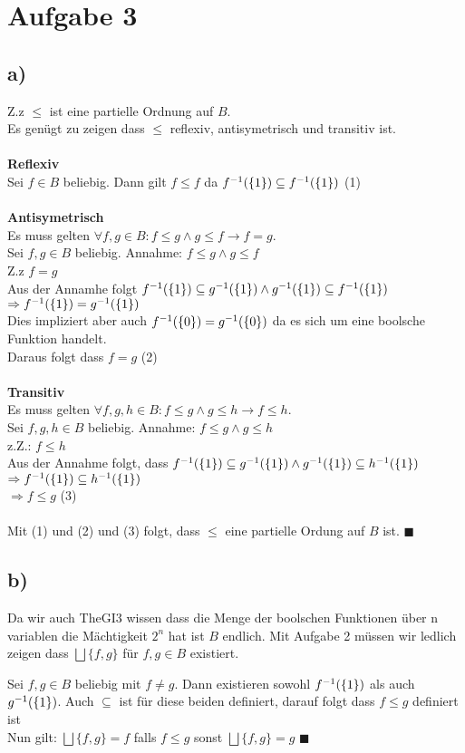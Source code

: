 \section*{Aufgabe 3}
\subsection*{a)}

Z.z $\leq$ ist eine partielle Ordnung auf $B$.\\
Es genügt zu zeigen dass $\leq$ reflexiv, antisymetrisch und transitiv ist.\\\\
\textbf{Reflexiv\\}
Sei $f \in B$ beliebig. Dann gilt $f \leq f$ da $f^{-1}(\{1\}) \subseteq f^{-1}(\{1\})$ (1)\\\\
\textbf{Antisymetrisch \\}
Es muss gelten $\forall f,g \in B : f \leq g \land g \leq f \rightarrow f =g$.\\
Sei $f,g \in B$ beliebig. 
Annahme: $f \leq g \land g \leq f $ \\
Z.z $f =g$\\
Aus der Annamhe folgt $f^{-1}(\{1\}) \subseteq g^{-1}(\{1\}) \land g^{-1}(\{1\}) \subseteq f^{-1}(\{1\}) $\\
 $\Rightarrow f^{-1}(\{1\}) = g^{-1}(\{1\})$\\
Dies impliziert aber auch $f^{-1}(\{0\}) = g^{-1}(\{0\})$ da es sich um eine boolsche Funktion handelt.\\
Daraus folgt dass $f=g$ (2)\\\\
\textbf{Transitiv\\}
Es muss gelten $\forall f,g,h \in B : f \leq g \land g \leq h \rightarrow f \leq h$.\\
Sei $f,g,h \in B$ beliebig. 
Annahme: $f \leq g \land g \leq h$\\
z.Z.: $f \leq h$\\
Aus der Annahme folgt, dass  $f^{-1}(\{1\}) \subseteq g^{-1}(\{1\}) \land g^{-1}(\{1\}) \subseteq h^{-1}(\{1\})$\\
$\Rightarrow f^{-1}(\{1\}) \subseteq h^{-1}(\{1\})$\\
$\Rightarrow f \leq g$ (3)\\\\
Mit (1) und (2) und (3) folgt, dass $\leq$ eine partielle Ordung auf $B$ ist. $\blacksquare$

\subsection*{b)}
Da wir auch TheGI3 wissen dass die Menge der boolschen Funktionen über n variablen die Mächtigkeit $2^n$ hat ist $B$ endlich.
Mit Aufgabe 2 müssen wir ledlich zeigen dass $ \bigsqcup \{f,g\}$ für $f,g \in B$ existiert.

Sei $f,g \in B$ beliebig mit $f \neq g$. 
Dann existieren sowohl $f^{-1}(\{1\})$ als auch $g^{-1}(\{1\})$. Auch $\subseteq$ ist für diese beiden definiert, darauf folgt dass $f \leq g$ definiert ist\\
Nun gilt:
$ \bigsqcup \{f,g\}= f$ falls $f \leq g$ sonst 
$ \bigsqcup \{f,g\}= g$ $\blacksquare$


